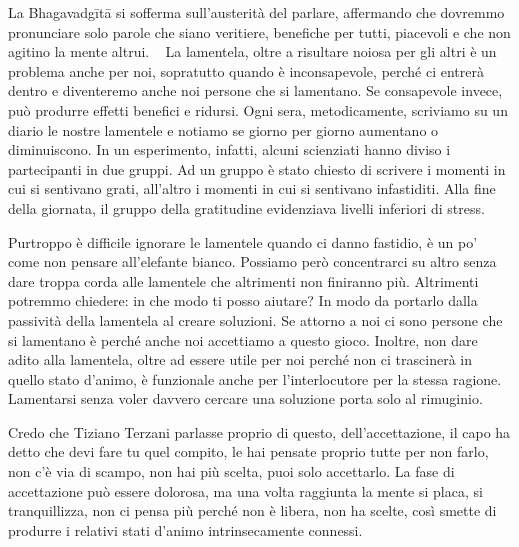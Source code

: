 \documentclass[12pt]{book} %
\begin{document}
\begin{mdframed}[linewidth=1pt]
La Bhagavadgītā si sofferma sull'austerità del parlare, affermando che dovremmo pronunciare solo
parole che siano veritiere, benefiche per tutti, piacevoli e che non agitino la mente altrui. \ \newline
\newline
La lamentela, oltre a risultare noiosa per gli altri è un problema anche per noi, sopratutto quando è inconsapevole,
perché ci entrerà dentro e diventeremo anche noi persone che si 
lamentano. Se consapevole invece, può produrre effetti benefici
e ridursi. Ogni sera, metodicamente, scriviamo su un diario le nostre lamentele e notiamo se giorno per giorno
aumentano o diminuiscono. In un esperimento, infatti, alcuni scienziati hanno diviso i partecipanti in due gruppi. Ad
un gruppo è stato chiesto di scrivere i momenti in cui si sentivano grati, all'altro i momenti in
cui si sentivano infastiditi. Alla fine della giornata, il gruppo della gratitudine evidenziava livelli inferiori di
stress. 

Purtroppo è difficile ignorare le lamentele quando ci danno fastidio, è un po' come non pensare
all'elefante bianco. Possiamo però concentrarci su altro senza dare troppa corda alle lamentele
che altrimenti non finiranno più. Altrimenti potremmo chiedere: in che modo ti posso aiutare? In modo da portarlo dalla
passività della lamentela al creare soluzioni. Se attorno a noi ci sono persone che si lamentano è perché anche noi
accettiamo a questo gioco. Inoltre, non dare adito alla lamentela, oltre ad essere utile per noi perché non ci
trascinerà in quello stato d'animo, è funzionale anche per l'interlocutore
per la stessa ragione. Lamentarsi senza voler davvero cercare una soluzione porta solo al rimuginio.
\end{mdframed}

Credo che Tiziano Terzani parlasse proprio di questo, dell'accettazione, il capo ha detto che devi
fare tu quel compito, le hai pensate proprio tutte per non farlo, non c'è via di scampo, non hai
più scelta, puoi solo accettarlo. La fase di accettazione può essere dolorosa, ma una volta raggiunta la mente si
placa, si tranquillizza, non ci pensa più perché non è libera, non ha scelte, così smette di produrre i relativi stati
d'animo intrinsecamente connessi.
\end{document}

